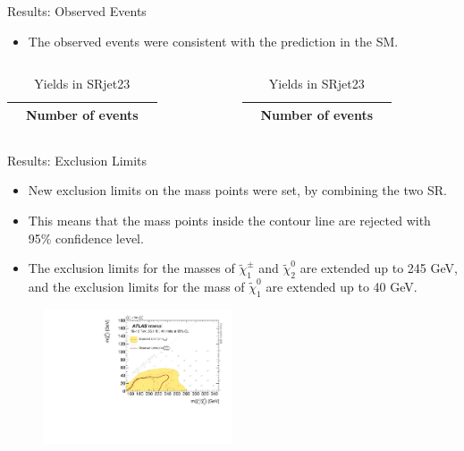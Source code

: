 \documentclass[mathserif,serif]{beamer}
\begin{document}
\begin{frame}{Results: Observed Events}
\begin{itemize}
\item The observed events were consistent with the prediction in the SM.
\end{itemize}
\begin{table}[htbp]
\centering

\begin{columns}

\begin{column}{0.5\textwidth}
\begin{tabular}{|c|c|c|}
\hline
& Number of events \\
\hline

\end{tabular}
\caption{Yields in SRjet1}
\end{column}

\begin{column}{0.5\textwidth}
\begin{tabular}{|c|c|c|}
\hline
& Number of events \\
\hline

\end{tabular}
\caption{Yields in SRjet23}
\end{column}

\end{columns}
\end{table}
\end{frame}

\begin{frame}{Results: Exclusion Limits}
\begin{itemize}
\item New exclusion limits on the mass points were set, by combining the two SR.
\item This means that the mass points inside the contour line are rejected with 95\% confidence level.
\item The exclusion limits for the masses of $\tilde{\chi}_1^\pm$ and $\tilde{\chi}_2^0$ are extended up to 245 GeV, and the exclusion limits for the mass of $\tilde{\chi}_1^0$ are extended up to 40 GeV.
\end{itemize}
\begin{figure}
\centering
\includegraphics[width=0.5\textwidth]{data/plot/HistFitterResults/contourPlotterWhSS_upperLimit.pdf}
\end{figure}
\end{frame}
\end{document}

